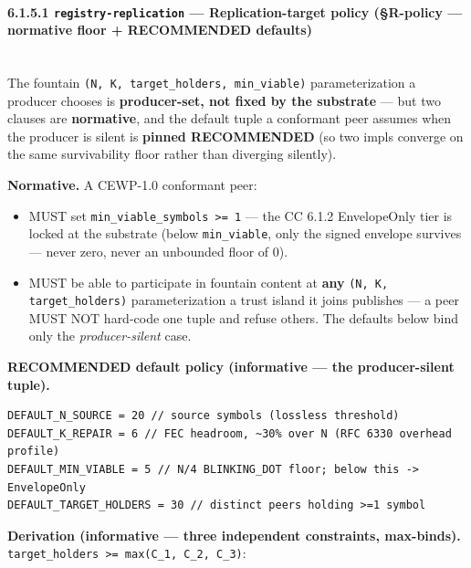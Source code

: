 \documentclass[11pt]{article}
\begin{document}
\paragraph{6.1.5.1 \texttt{registry-replication} — Replication-target policy (§R-policy — normative floor + RECOMMENDED defaults)}\mbox{}\\


The fountain \texttt{(N, K, target\_holders, min\_viable)} parameterization a producer chooses is \textbf{producer-set, not fixed by the substrate} — but two clauses are \textbf{normative}, and the default tuple a conformant peer assumes when the producer is silent is \textbf{pinned RECOMMENDED} (so two impls converge on the same survivability floor rather than diverging silently).


\textbf{Normative.} A CEWP-1.0 conformant peer:

\begin{itemize}\setlength\itemsep{0pt}
\item MUST set \texttt{min\_viable\_symbols >= 1} — the CC 6.1.2 EnvelopeOnly tier is locked at the substrate (below \texttt{min\_viable}, only the signed envelope survives — never zero, never an unbounded floor of 0).
\item MUST be able to participate in fountain content at \textbf{any} \texttt{(N, K, target\_holders)} parameterization a trust island it joins publishes — a peer MUST NOT hard-code one tuple and refuse others. The defaults below bind only the \textit{producer-silent} case.
\end{itemize}


\textbf{RECOMMENDED default policy (informative — the producer-silent tuple).}


\begin{lstlisting}
DEFAULT_N_SOURCE = 20 // source symbols (lossless threshold)
DEFAULT_K_REPAIR = 6 // FEC headroom, ~30% over N (RFC 6330 overhead profile)
DEFAULT_MIN_VIABLE = 5 // N/4 BLINKING_DOT floor; below this -> EnvelopeOnly
DEFAULT_TARGET_HOLDERS = 30 // distinct peers holding >=1 symbol
\end{lstlisting}

\textbf{Derivation (informative — three independent constraints, max-binds).} \texttt{target\_holders >= max(C\_1, C\_2, C\_3)}:
\end{document}
